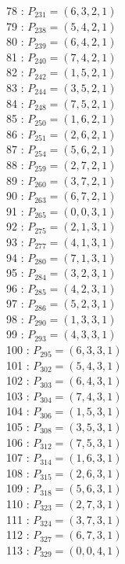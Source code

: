 \documentclass{article}
\begin{document}
{\begin{multicols}{3}
78 : $P_{231}=( 6, 3, 2, 1 )$\\
79 : $P_{238}=( 5, 4, 2, 1 )$\\
80 : $P_{239}=( 6, 4, 2, 1 )$\\
81 : $P_{240}=( 7, 4, 2, 1 )$\\
82 : $P_{242}=( 1, 5, 2, 1 )$\\
83 : $P_{244}=( 3, 5, 2, 1 )$\\
84 : $P_{248}=( 7, 5, 2, 1 )$\\
85 : $P_{250}=( 1, 6, 2, 1 )$\\
86 : $P_{251}=( 2, 6, 2, 1 )$\\
87 : $P_{254}=( 5, 6, 2, 1 )$\\
88 : $P_{259}=( 2, 7, 2, 1 )$\\
89 : $P_{260}=( 3, 7, 2, 1 )$\\
90 : $P_{263}=( 6, 7, 2, 1 )$\\
91 : $P_{265}=( 0, 0, 3, 1 )$\\
92 : $P_{275}=( 2, 1, 3, 1 )$\\
93 : $P_{277}=( 4, 1, 3, 1 )$\\
94 : $P_{280}=( 7, 1, 3, 1 )$\\
95 : $P_{284}=( 3, 2, 3, 1 )$\\
96 : $P_{285}=( 4, 2, 3, 1 )$\\
97 : $P_{286}=( 5, 2, 3, 1 )$\\
98 : $P_{290}=( 1, 3, 3, 1 )$\\
99 : $P_{293}=( 4, 3, 3, 1 )$\\
100 : $P_{295}=( 6, 3, 3, 1 )$\\
101 : $P_{302}=( 5, 4, 3, 1 )$\\
102 : $P_{303}=( 6, 4, 3, 1 )$\\
103 : $P_{304}=( 7, 4, 3, 1 )$\\
104 : $P_{306}=( 1, 5, 3, 1 )$\\
105 : $P_{308}=( 3, 5, 3, 1 )$\\
106 : $P_{312}=( 7, 5, 3, 1 )$\\
107 : $P_{314}=( 1, 6, 3, 1 )$\\
108 : $P_{315}=( 2, 6, 3, 1 )$\\
109 : $P_{318}=( 5, 6, 3, 1 )$\\
110 : $P_{323}=( 2, 7, 3, 1 )$\\
111 : $P_{324}=( 3, 7, 3, 1 )$\\
112 : $P_{327}=( 6, 7, 3, 1 )$\\
113 : $P_{329}=( 0, 0, 4, 1 )$\\

\end{multicols}}
\end{document}
